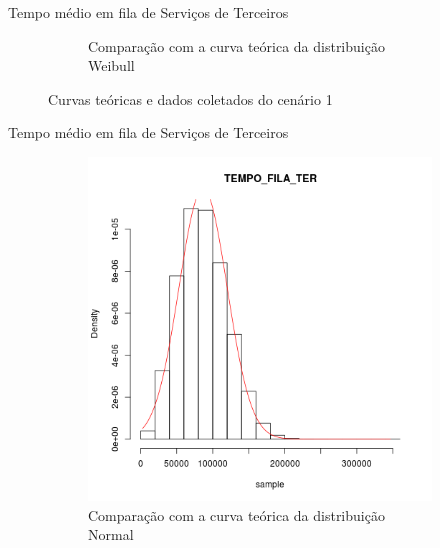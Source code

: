 \documentclass[xcolor=dvipsnames]{beamer}
\begin{document}
\begin{frame}{Tempo médio em fila de Serviços de Terceiros}
\begin{figure}[H]
\begin{subfigure}[H]{0.4\textwidth}
			\caption{Comparação com a curva teórica da distribuição Weibull}
			\label{fig:C1-wei}
		\end{subfigure}
		\caption{Curvas teóricas e dados coletados do cenário 1}
	\end{figure}
\end{frame}
	
\begin{frame}{Tempo médio em fila de Serviços de Terceiros}
	\begin{figure}[H]
		\centering
		\begin{subfigure}[H]{0.4\textwidth}
			\includegraphics[width=\textwidth]{img/C2-hist-norm-TEMPO_FILA_TER.png}
			\caption{Comparação com a curva teórica da distribuição Normal}
			\label{fig:C2-norm}
		\end{subfigure}
		\begin{subfigure}[H]{0.4\textwidth}

\end{subfigure}
\end{figure}
\end{frame}
\end{document}
